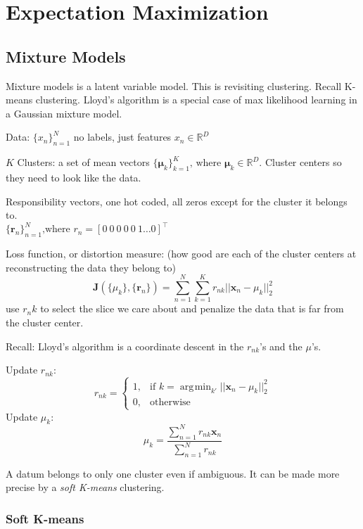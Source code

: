\documentclass[11pt, oneside]{article}   	%
\DeclareMathOperator*{\argmin}{\arg\!\min}
\begin{document}
\section{Expectation Maximization}

\subsection{Mixture Models}

Mixture models is a latent variable model. This is revisiting clustering. Recall K-means clustering. Lloyd's algorithm is a special case of max likelihood learning in a Gaussian mixture model.

Data: $\{x_n\}_{n=1}^N$ no labels, just features $x_n \in \mathbb{R}^D$

$K$ Clusters: a set of mean vectors $\{\mathbf{\mu}_k\}_{k=1}^K \text{, where } \mathbf{\mu}_k \in \mathbb{R}^D$. Cluster centers so they need to look like the data.

Responsibility vectors, one hot coded, all zeros except for the cluster it belongs to.\\
$\{\mathbf{r}_n\}_{n=1}^N\text{,where }  r_n = [ 0\: 0\: 0\: 0\: 0\: 1 \hdots 0]^\intercal$ 

Loss function, or distortion measure: (how good are each of the cluster centers at reconstructing the data they belong to) 
\begin{equation}
\mathbf{J}(\{\mu_k\},\{ \mathbf{r}_n\}) = \sum_{n=1}^N \sum_{k=1}^K r_{nk} ||\mathbf{x}_n - \mu_k||_2^2 
\end{equation}
use $r_nk$ to select the slice we care about and penalize the data that is far from the cluster center.

Recall: Lloyd's algorithm is a coordinate descent in the $r_{nk}$'s and the $\mu$'s.

Update $r_{nk}$:
\[
r_{nk} =
	\begin{cases}
	  	1, &\text{if  }k = \argmin_{k'} ||\mathbf{x}_n - \mu_k||_2^2 \\
		0, &\text{otherwise}
	\end{cases}
\]
Update $\mu_k$:
\[
\mu_k = \frac{\sum_{n=1}^N r_{nk}\mathbf{x}_n}{\sum_{n=1}^N r_{nk}}
\]

A datum belongs to only one cluster even if ambiguous. It can be made more precise by a \emph{soft K-means} clustering.

\subsubsection{Soft K-means}
\end{document}
